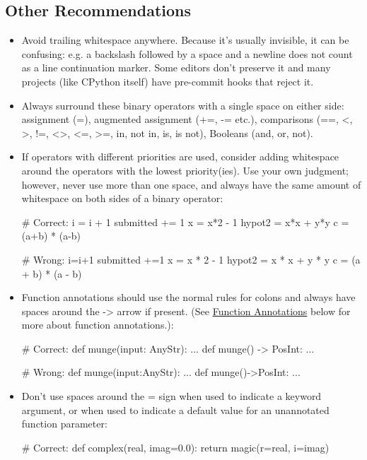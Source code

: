 \documentclass[a4paper,11pt]{article}
\begin{document}
\subsection{Other Recommendations}
\begin{itemize}
\item Avoid trailing whitespace anywhere. Because it’s usually invisible, it can
be confusing: e.g. a backslash followed by a space and a newline does not count
as a line continuation marker. Some editors don’t preserve it and many projects
(like CPython itself) have pre-commit hooks that reject it.
\item Always surround these binary operators with a single space on either side:
assignment (=), augmented assignment (+=, -= etc.), comparisons (==, <, >, !=, <>,
<=, >=, in, not in, is, is not), Booleans (and, or, not).
\item If operators with different priorities are used, consider adding whitespace
around the operators with the lowest priority(ies). Use your own judgment;
however, never use more than one space, and always have the same amount of
whitespace on both sides of a binary operator:
\begin{python}
# Correct:
i = i + 1
submitted += 1
x = x*2 - 1
hypot2 = x*x + y*y
c = (a+b) * (a-b)
\end{python}
\begin{python}
# Wrong:
i=i+1
submitted +=1
x = x * 2 - 1
hypot2 = x * x + y * y
c = (a + b) * (a - b)
\end{python}
\item Function annotations should use the normal rules for colons and always
have spaces around the -> arrow if present.
(See \hyperref[sec:function_annotations]{Function Annotations} below for more
about function annotations.):
\begin{python}
# Correct:
def munge(input: AnyStr): ...
def munge() -> PosInt: ...
\end{python}
\begin{python}
# Wrong:
def munge(input:AnyStr): ...
def munge()->PosInt: ...
\end{python}
\item Don’t use spaces around the = sign when used to indicate a keyword
argument, or when used to indicate a default value for an unannotated function
parameter:
\begin{python}
# Correct:
def complex(real, imag=0.0):
    return magic(r=real, i=imag)
\end{python}
\begin{python}

\end{python}
\end{itemize}
\end{document}
